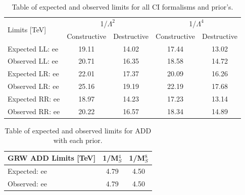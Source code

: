     \begin {table}[h]
        \begin{center}
        \begin{tabular}{  l | c | c | c | c  } 
            \hline
            \hline
            \multirow{2}{*}{Limits [TeV]} & \multicolumn{2}{c|}{1/$\Lambda^2$} & \multicolumn{2}{c}{1/$\Lambda^4$} \\
            \cline{2-5}
             & Constructive & Destructive & Constructive & Destructive \\
            \hline
            Expected LL: ee       & 19.11 & 14.02 & 17.44 & 13.02 \\
            Observed LL: ee       & 20.71 & 16.35 & 18.58 & 14.72 \\
            \hline
            Expected LR: ee       & 22.01 & 17.37 & 20.09 & 16.26 \\
            Observed LR: ee       & 25.16 & 19.19 & 22.19 & 17.68 \\
            \hline
            Expected RR: ee       & 18.97 & 14.23 & 17.23 & 13.14 \\
            Observed RR: ee       & 20.22 & 16.57 & 18.34 & 14.89 \\
            \hline
            \hline
        \end{tabular}
        \caption{Table of expected and observed limits for all CI formalisms and prior's.}
        \label{tab:limits_CI}
        \end{center}
    \end {table}


    \begin {table}[h]
        \begin{center}
        \begin{tabular}{ l | c | c } 
            \hline
            \hline
            GRW ADD Limits [TeV] & 1/M$_S^4$ & 1/M$_S^8$ \\
            \hline
            Expected: ee & 4.79 & 4.50 \\
            Observed: ee & 4.79 & 4.50 \\
            \hline
            \hline
        \end{tabular}
        \caption{Table of expected and observed limits for ADD with each prior.}
        \label{tab:limits_ADD}
        \end{center}
    \end {table}


